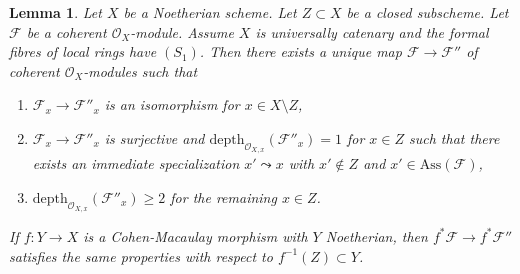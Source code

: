 \documentclass{stacks-project}
\theoremstyle{plain}
\newtheorem{lemma}[subsection]{Lemma}
\theoremstyle{definition}
\theoremstyle{remark}
\numberwithin{equation}{subsection}
\begin{document}
\begin{lemma}
\label{lemma-make-S2-along-Z}
Let $X$ be a Noetherian scheme. Let $Z \subset X$ be a closed subscheme.
Let $\mathcal{F}$ be a coherent $\mathcal{O}_X$-module. Assume
$X$ is universally catenary and the formal fibres of local rings have $(S_1)$.
Then there exists a unique map $\mathcal{F} \to \mathcal{F}''$
of coherent $\mathcal{O}_X$-modules such that
\begin{enumerate}
\item $\mathcal{F}_x \to \mathcal{F}''_x$
is an isomorphism for $x \in X \setminus Z$,
\item $\mathcal{F}_x \to \mathcal{F}''_x$ is surjective and
$\text{depth}_{\mathcal{O}_{X, x}}(\mathcal{F}''_x) = 1$
for $x \in Z$ such that there exists an immediate specialization
$x' \leadsto x$ with $x' \not \in Z$ and $x' \in \text{Ass}(\mathcal{F})$,
\item $\text{depth}_{\mathcal{O}_{X, x}}(\mathcal{F}''_x) \geq 2$
for the remaining $x \in Z$.
\end{enumerate}
If $f : Y \to X$ is a Cohen-Macaulay morphism with $Y$ Noetherian,
then $f^*\mathcal{F} \to f^*\mathcal{F}''$ satisfies the same properties
with respect to $f^{-1}(Z) \subset Y$.
\end{lemma}
\end{document}
